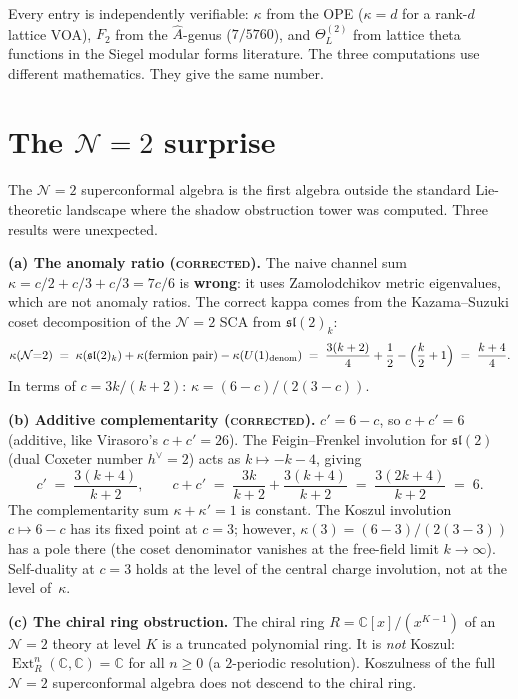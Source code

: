 \documentclass[11pt]{article}
\newcommand{\cN}{\mathcal{N}}
\newcommand{\fsl}{\mathfrak{sl}}
\newcommand{\C}{\mathbb{C}}
\newcommand{\Ext}{\operatorname{Ext}}
\begin{document}
\medskip

Every entry is independently verifiable: $\kappa$ from the
OPE ($\kappa=d$ for a rank-$d$ lattice VOA), $F_2$ from the
$\hat{A}$-genus ($7/5760$), and $\Theta_L^{(2)}$ from lattice
theta functions in the Siegel modular forms literature.  The
three computations use different mathematics.  They give the
same number.


\section{The $\cN = 2$ surprise}
\label{sec:n2-surprise}

The $\cN = 2$ superconformal algebra is the first algebra outside
the standard Lie-theoretic landscape where the shadow obstruction tower was
computed.  Three results were unexpected.

\medskip
\noindent\textbf{(a) The anomaly ratio (\textsc{corrected}).}\enspace
The naive channel sum $\kappa = c/2 + c/3 + c/3 = 7c/6$ is
\textbf{wrong}: it uses Zamolodchikov metric eigenvalues, which
are not anomaly ratios.  The correct kappa comes from the
Kazama--Suzuki coset decomposition of the $\cN = 2$ SCA from
$\fsl(2)_k$:
\[
\kappa(\cN{=}2)
\;=\; \kappa(\fsl(2)_k) + \kappa(\text{fermion pair})
      - \kappa(U(1)_{\text{denom}})
\;=\; \frac{3(k+2)}{4} + \frac{1}{2} - \Bigl(\frac{k}{2}+1\Bigr)
\;=\; \frac{k+4}{4}.
\]
In terms of $c = 3k/(k+2)$: $\kappa = (6-c)/(2(3-c))$.

\medskip
\noindent\textbf{(b) Additive complementarity (\textsc{corrected}).}\enspace
$c' = 6 - c$, so $c + c' = 6$ (additive, like Virasoro's
$c + c' = 26$).  The Feigin--Frenkel involution for $\fsl(2)$
(dual Coxeter number $h^\vee = 2$) acts as $k \mapsto -k - 4$,
giving
\[
c' \;=\; \frac{3(k+4)}{k+2},
\qquad
c + c' \;=\; \frac{3k}{k+2} + \frac{3(k+4)}{k+2}
\;=\; \frac{3(2k+4)}{k+2} \;=\; 6.
\]
The complementarity sum $\kappa + \kappa' = 1$ is constant.
The Koszul involution $c \mapsto 6-c$ has its fixed point at
$c = 3$; however, $\kappa(3) = (6-3)/(2(3-3))$ has a pole there
(the coset denominator vanishes at the free-field limit
$k \to \infty$).  Self-duality at $c = 3$ holds at the level
of the central charge involution, not at the level of~$\kappa$.

\medskip
\noindent\textbf{(c) The chiral ring obstruction.}\enspace
The chiral ring $R = \C[x]/(x^{K-1})$ of an $\cN = 2$ theory at
level $K$ is a truncated polynomial ring.  It is \emph{not}
Koszul: $\Ext^n_R(\C,\C) = \C$ for all $n \geq 0$ (a
$2$-periodic resolution).  Koszulness of the full $\cN = 2$
superconformal algebra does not descend to the chiral ring.
\end{document}
